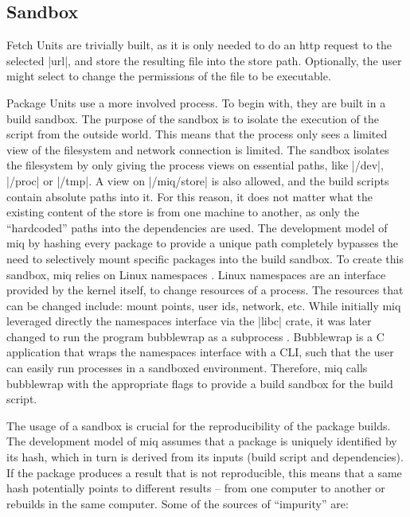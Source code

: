 \subsection{Sandbox}

Fetch Units are trivially built, as it is only needed to do
an http request to the selected |url|, and store the
resulting file into the store path. Optionally, the user
might select to change the permissions of the file to be executable.

Package Units use a more involved process. To begin with,
they are built in a build sandbox. The purpose of the
sandbox is to isolate the execution of the script from the
outside world. This means that the process only sees a
limited view of the filesystem and network connection is
limited. The sandbox isolates the filesystem by only giving
the process views on essential paths, like |/dev|, |/proc|
or |/tmp|. A view on |/miq/store| is also allowed, and the
build scripts contain absolute paths into it. For this
reason, it does not matter what the existing content of the
store is from one machine to another, as only the
``hardcoded'' paths into the dependencies are used. The
development model of miq by hashing every package to provide
a unique path completely bypasses the need to selectively
mount specific packages into the build sandbox. To create
this sandbox, miq relies on Linux namespaces
\cite{NamespacesLinuxManualb} . Linux namespaces are an
interface provided by the kernel itself, to change
resources of a process. The resources that can be changed
include: mount points, user ids, network, etc. While
initially miq leveraged directly the namespaces interface
via the |libc| crate, it was later changed to run the
program bubblewrap as a subprocess . Bubblewrap \cite{Bubblewrap2023} is a C
application that wraps the namespaces interface with a
\ac{CLI}, such that the user can easily run processes in a
sandboxed environment. Therefore, miq calls bubblewrap with
the appropriate flags to provide a build sandbox for the
build script.

The usage of a sandbox is crucial for the reproducibility of
the package builds. The development model of miq assumes
that a package is uniquely identified by its hash, which in
turn is derived from its inputs (build script and
dependencies). If the package produces a result that is not
reproducible, this means that a same hash potentially points
to different results -- from one computer to another or
rebuilds in the same computer. Some of the sources of
``impurity'' are:

